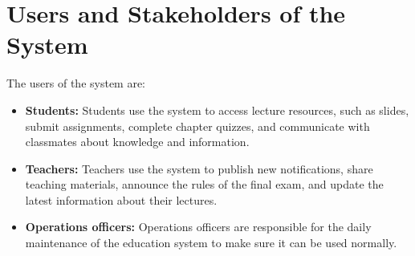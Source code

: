 \section{Users and Stakeholders of the System}

The users of the system are:
\begin{itemize}
    \item \textbf{Students:}
    Students use the system to access lecture resources, such as slides, submit assignments, complete chapter quizzes, and communicate with classmates about knowledge and information.

    \item \textbf{Teachers:}
    Teachers use the system to publish new notifications, share teaching materials, announce the rules of the final exam, and update the latest information about their lectures.

    \item \textbf{Operations officers:}
    Operations officers are responsible for the daily maintenance of the education system to make sure it can be used normally.
\end{itemize}
